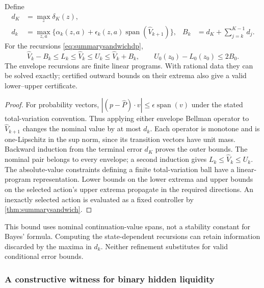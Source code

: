 \begin{proposition}
\label{prop:summaryrate}
Define
\begin{align}\label{eq:summaryrateconstants}
 d_K&=\max_z\delta_K(z),\nonumber\\
 d_k&=\max_{z,a}\{\alpha_k(z,a)+
                   \epsilon_k(z,a)\operatorname{span}(\widehat V_{k+1})\},
 &B_k&=d_K+\sum_{j=k}^{K-1}d_j.
\end{align}
For the recursions \eqref{eq:summarysandwichdp},
\begin{equation}\label{eq:summaryrate}
 \widehat V_k-B_k\le L_k\le\widehat V_k\le U_k
                         \le\widehat V_k+B_k,\qquad
 U_0(z_0)-L_0(z_0)\le2B_0.
\end{equation}
The envelope recursions are finite linear programs. With rational data they
can be solved exactly; certified outward bounds on their extrema also give
a valid lower--upper certificate.
\end{proposition}
\begin{proof}
For probability vectors,
$|(p-\widehat P)\cdot v|\le\epsilon\operatorname{span}(v)$ under the
stated total-variation convention. Thus applying either envelope Bellman
operator to $\widehat V_{k+1}$ changes the nominal value by at most $d_k$.
Each operator is monotone and is one-Lipschitz in the sup norm, since its
transition vectors have unit mass. Backward induction from the terminal
error $d_K$ proves the outer bounds. The nominal pair belongs to every
envelope; a second induction gives $L_k\le\widehat V_k\le U_k$.
The absolute-value constraints defining a finite total-variation ball have
a linear-program representation. Lower bounds on the lower extrema and
upper bounds on the selected action's upper extrema propagate in the
required directions. An inexactly selected action is evaluated as a fixed
controller by \cref{thm:summarysandwich}.
\end{proof}

This bound uses nominal continuation-value spans, not a stability constant
for Bayes' formula. Computing the state-dependent recursions can retain
information discarded by the maxima in $d_k$. Neither refinement substitutes
for valid conditional error bounds.

\subsubsection*{A constructive witness for binary hidden liquidity}

